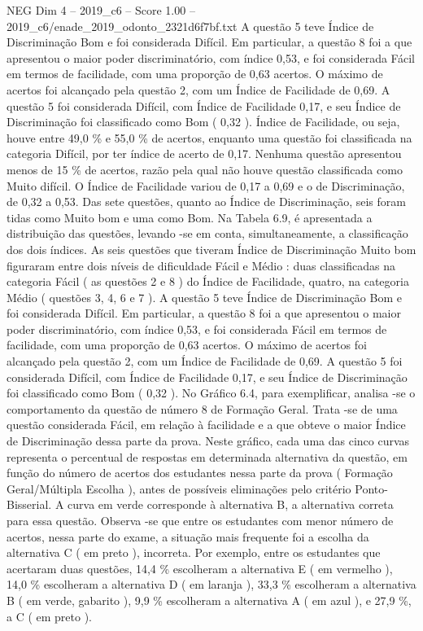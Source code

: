 \begin{textsample}{NEG Dim 4 – 2019\_c6 – Score 1.00 – 2019\_c6/enade\_2019\_odonto\_2321d6f7bf.txt}
A questão 5 teve Índice de Discriminação Bom e foi considerada Difícil.
Em particular, a questão 8 foi a que apresentou o maior poder discriminatório, com índice 0,53, e foi considerada Fácil em termos de facilidade, com uma proporção de 0,63 acertos.
O máximo de acertos foi alcançado pela questão 2, com um Índice de Facilidade de 0,69.
A questão 5 foi considerada Difícil, com Índice de Facilidade 0,17, e seu Índice de Discriminação foi classificado como Bom ( 0,32 ).
Índice de Facilidade, ou seja, houve entre 49,0 \% e 55,0 \% de acertos, enquanto uma questão foi classificada na categoria Difícil, por ter índice de acerto de 0,17.
Nenhuma questão apresentou menos de 15 \% de acertos, razão pela qual não houve questão classificada como Muito difícil.
O Índice de Facilidade variou de 0,17 a 0,69 e o de Discriminação, de 0,32 a 0,53.
Das sete questões, quanto ao Índice de Discriminação, seis foram tidas como Muito bom e uma como Bom.
Na Tabela 6.9, é apresentada a distribuição das questões, levando -se em conta, simultaneamente, a classificação dos dois índices.
As seis questões que tiveram Índice de Discriminação Muito bom figuraram entre dois níveis de dificuldade Fácil e Médio : duas classificadas na categoria Fácil ( as questões 2 e 8 ) do Índice de Facilidade, quatro, na categoria Médio ( questões 3, 4, 6 e 7 ).
A questão 5 teve Índice de Discriminação Bom e foi considerada Difícil.
Em particular, a questão 8 foi a que apresentou o maior poder discriminatório, com índice 0,53, e foi considerada Fácil em termos de facilidade, com uma proporção de 0,63 acertos.
O máximo de acertos foi alcançado pela questão 2, com um Índice de Facilidade de 0,69.
A questão 5 foi considerada Difícil, com Índice de Facilidade 0,17, e seu Índice de Discriminação foi classificado como Bom ( 0,32 ).
No Gráfico 6.4, para exemplificar, analisa -se o comportamento da questão de número 8 de Formação Geral.
Trata -se de uma questão considerada Fácil, em relação à facilidade e a que obteve o maior Índice de Discriminação dessa parte da prova.
Neste gráfico, cada uma das cinco curvas representa o percentual de respostas em determinada alternativa da questão, em função do número de acertos dos estudantes nessa parte da prova ( Formação Geral/Múltipla Escolha ), antes de possíveis eliminações pelo critério Ponto-Bisserial.
A curva em verde corresponde à alternativa B, a alternativa correta para essa questão.
Observa -se que entre os estudantes com menor número de acertos, nessa parte do exame, a situação mais frequente foi a escolha da alternativa C ( em preto ), incorreta.
Por exemplo, entre os estudantes que acertaram duas questões, 14,4 \% escolheram a alternativa E ( em vermelho ), 14,0 \% escolheram a alternativa D ( em laranja ), 33,3 \% escolheram a alternativa B ( em verde, gabarito ), 9,9 \% escolheram a alternativa A ( em azul ), e 27,9 \%, a C ( em preto ).

\end{textsample}
